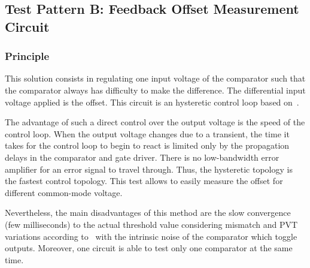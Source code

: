 \subsection{Test Pattern B: Feedback Offset Measurement Circuit}
\subsubsection{Principle}
This solution consists in regulating one input voltage of the comparator such that the comparator always has difficulty to make the difference. The differential input voltage applied is the offset. This circuit is an hysteretic control loop based on~\cite{1594475}.

The advantage of such a direct control over the output voltage is the speed of the control loop. When the output voltage changes due to a transient, the time it takes for the control loop to begin to react is limited only by the propagation delays in the comparator and gate driver. There is no low-bandwidth error amplifier for an error signal to travel through. Thus, the hysteretic topology is the fastest control topology. This test allows to easily measure the offset for different common-mode voltage.

Nevertheless, the main disadvantages of this method are the slow convergence (few milliseconds) to the actual threshold value considering mismatch and PVT variations according to~\cite{7050041} with the intrinsic noise of the comparator which toggle outputs. Moreover, one circuit is able to test only one comparator at the same time.

